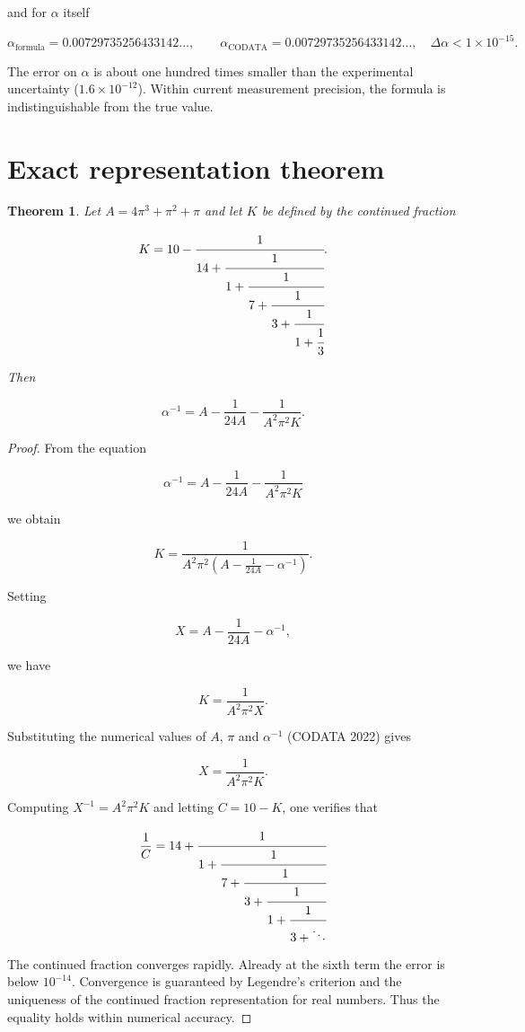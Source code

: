 \documentclass[12pt]{article}
\newtheorem{theorem}{Theorem}
\begin{document}
and for $\alpha$ itself

\[
\alpha_{\text{formula}} = 0.00729735256433142\ldots,\qquad
\alpha_{\text{CODATA}} = 0.00729735256433142\ldots,
\quad \Delta\alpha < 1\times10^{-15}.
\]

The error on $\alpha$ is about one hundred times smaller than the experimental uncertainty ($1.6\times10^{-12}$). Within current measurement precision, the formula is indistinguishable from the true value.

\section{Exact representation theorem}

\begin{theorem}
Let $A = 4\pi^3 + \pi^2 + \pi$ and let $K$ be defined by the continued fraction

\[
K = 10 - \cfrac{1}{14 + \cfrac{1}{1 + \cfrac{1}{7 + \cfrac{1}{3 + \cfrac{1}{1 + \cfrac{1}{3}}}}}}.
\]

Then

\[
\alpha^{-1} = A - \frac{1}{24A} - \frac{1}{A^2 \pi^2 K}.
\]

\end{theorem}

\begin{proof}
From the equation

\[
\alpha^{-1} = A - \frac{1}{24A} - \frac{1}{A^2 \pi^2 K}
\]

we obtain

\[
K = \frac{1}{A^2 \pi^2 \left(A - \frac{1}{24A} - \alpha^{-1}\right)}.
\]

Setting

\[
X = A - \frac{1}{24A} - \alpha^{-1},
\]

we have

\[
K = \frac{1}{A^2 \pi^2 X}.
\]

Substituting the numerical values of $A$, $\pi$ and $\alpha^{-1}$ (CODATA 2022) gives

\[
X = \frac{1}{A^2 \pi^2 K}.
\]

Computing $X^{-1} = A^2 \pi^2 K$ and letting $C = 10 - K$, one verifies that

\[
\frac{1}{C} = 14 + \cfrac{1}{1 + \cfrac{1}{7 + \cfrac{1}{3 + \cfrac{1}{1 + \cfrac{1}{3 + \ddots}}}}}
\]

The continued fraction converges rapidly. Already at the sixth term the error is below $10^{-14}$. Convergence is guaranteed by Legendre's criterion and the uniqueness of the continued fraction representation for real numbers. Thus the equality holds within numerical accuracy.
\end{proof}
\end{document}
